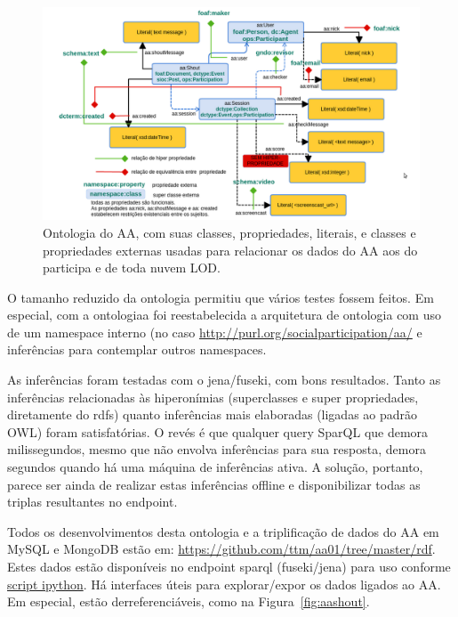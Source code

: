 \documentclass[12pt]{article}
\begin{document}
\begin{figure}[h!]
  \centering
    \includegraphics[width=\textwidth]{../figs/ontologiaa.png}
  \caption{Ontologia do AA, com suas classes, propriedades, literais, e classes e propriedades externas usadas para relacionar os dados do AA aos do participa e de toda nuvem LOD.}\label{fig:diaa}
\end{figure}

O tamanho reduzido da ontologia permitiu que vários testes fossem feitos. Em especial, com a ontologiaa foi reestabelecida a arquitetura de ontologia com uso de um namespace interno (no caso \url{http://purl.org/socialparticipation/aa/} e inferências para contemplar outros namespaces.

As inferências foram testadas com o jena/fuseki, com bons resultados. Tanto as inferências relacionadas às hiperonímias (superclasses e super propriedades, diretamente do rdfs) quanto inferências mais elaboradas (ligadas ao padrão OWL) foram satisfatórias. O revés é que qualquer query SparQL que demora milissegundos, mesmo que não envolva inferências para sua resposta, demora segundos quando há uma máquina de inferências ativa. A solução, portanto, parece ser ainda de realizar estas inferências offline e disponibilizar todas as triplas resultantes no endpoint.

Todos os desenvolvimentos desta ontologia e a triplificação de dados do AA em MySQL e MongoDB estão em: \url{https://github.com/ttm/aa01/tree/master/rdf}. Estes dados estão disponíveis no endpoint sparql (fuseki/jena) para uso conforme \url{script ipython}. Há interfaces úteis para explorar/expor os dados ligados ao AA. Em especial, estão derreferenciáveis, como na Figura~\ref{fig:aashout}.
\end{document}
